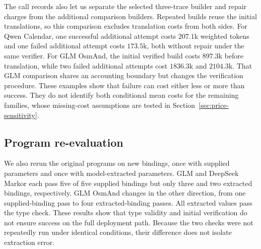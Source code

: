 The call records also let us separate the selected three-trace builder and repair charges from the additional comparison builders.
Repeated builds reuse the initial translations, so this comparison excludes translation costs from both sides.
For Qwen Calendar, one successful additional attempt costs $207.1$k weighted tokens and one failed additional attempt costs $173.5$k, both without repair under the same verifier.
For GLM OsmAnd, the initial verified build costs $897.3$k before translation, while two failed additional attempts cost $1836.3$k and $2104.3$k.
That GLM comparison shares an accounting boundary but changes the verification procedure.
These examples show that failure can cost either less or more than success.
They do not identify both conditional mean costs for the remaining families, whose missing-cost assumptions are tested in Section~\ref{sec:price-sensitivity}.

\subsection{Program re-evaluation}
We also rerun the original programs on new bindings, once with supplied parameters and once with model-extracted parameters.
GLM and DeepSeek Markor each pass five of five supplied bindings but only three and two extracted bindings, respectively.
GLM OsmAnd changes in the other direction, from one supplied-binding pass to four extracted-binding passes.
All extracted values pass the type check.
These results show that type validity and initial verification do not ensure success on the full deployment path.
Because the two checks were not repeatedly run under identical conditions, their difference does not isolate extraction error.

